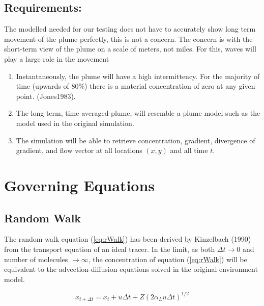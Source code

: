 \documentclass[11pt]{article} %
\begin{document}
\subsection{Requirements:}



The modelled needed for our testing does not have to accurately show long term movement of the plume perfectly, this is not a concern.  The concern is with the short-term view of the plume on a scale of meters, not miles.  For this, waves will play a large role in the movement

\begin{enumerate}
\item Instantaneously, the plume will have a high intermittency.   For the majority of time (upwards of 80\%) there is a material concentration of zero at any given point. (Jones1983).   

\item The long-term, time-averaged plume, will resemble a plume model such as the model used in the original simulation.

\item The simulation will be able to retrieve concentration, gradient, divergence of gradient, and flow vector at all locations $(x,y)$ and all time $t$.


\end{enumerate}




\section{Governing Equations} 
\subsection{Random Walk}
The random walk equation (\ref{eq:rWalk}) has been derived by Kinzelbach (1990) from the transport equation of an ideal tracer.  In the limit, as both $\Delta t \rightarrow 0$ and number of molecules $\rightarrow \infty$, the concentration of equation (\ref{eq:rWalk}) will be equivalent to the advection-diffusion equations solved in the original environment model.

\begin{equation} \label{eq:rWalk}
x_{t+\Delta t} = x_{t} + u\Delta t + Z(2 \alpha_L u\Delta t)^{1/2}
\end{equation}
\end{document}
